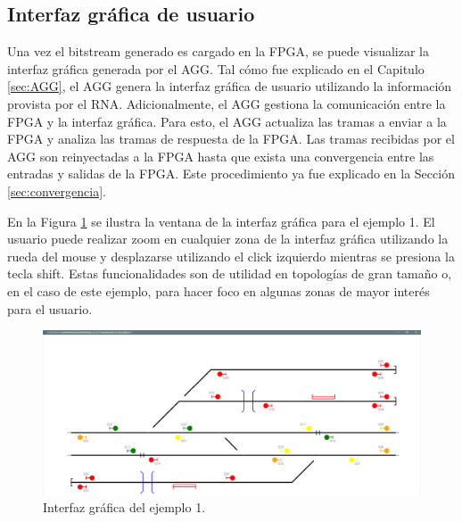 \subsection{Interfaz gráfica de usuario}
	\label{sec:AGG_GUI}
		
	Una vez el bitstream generado es cargado en la FPGA, se puede visualizar la interfaz gráfica generada por el AGG. Tal cómo fue explicado en el Capitulo \ref{sec:AGG}, el AGG genera la interfaz gráfica de usuario utilizando la información provista por el RNA. Adicionalmente, el AGG gestiona la comunicación entre la FPGA y la interfaz gráfica. Para esto, el AGG actualiza las tramas a enviar a la FPGA y analiza las tramas de respuesta de la FPGA. Las tramas recibidas por el AGG son reinyectadas a la FPGA hasta que exista una convergencia entre las entradas y salidas de la FPGA. Este procedimiento ya fue explicado en la Sección \ref{sec:convergencia}.
		
	En la Figura \ref{fig:EJ1_AGG} se ilustra la ventana de la interfaz gráfica para el ejemplo 1. El usuario puede realizar zoom en cualquier zona de la interfaz gráfica utilizando la rueda del mouse y desplazarse utilizando el click izquierdo mientras se presiona la tecla shift. Estas funcionalidades son de utilidad en topologías de gran tamaño o, en el caso de este ejemplo, para hacer foco en algunas zonas de mayor interés para el usuario.
	
	\begin{figure}[H]
		\centering
		\includegraphics[origin = c, width=1\textwidth]{resultados-obtenidos/ejemplo1/images/AGG_S32_YES}
		\centering\caption{Interfaz gráfica del ejemplo 1.}
		\label{fig:EJ1_AGG}
	\end{figure}
	
